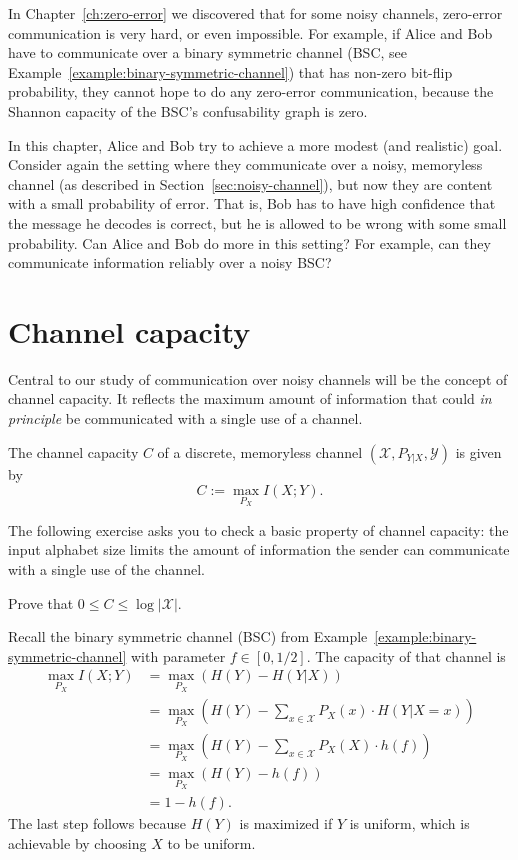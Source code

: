 

In Chapter~\ref{ch:zero-error} we discovered that for some noisy channels, zero-error communication is very hard, or even impossible. For example, if Alice and Bob have to communicate over a binary symmetric channel (BSC, see Example~\ref{example:binary-symmetric-channel}) that has non-zero bit-flip probability, they cannot hope to do any zero-error communication, because the Shannon capacity of the BSC's confusability graph is zero.

In this chapter, Alice and Bob try to achieve a more modest (and realistic) goal. Consider again the setting where they communicate over a noisy, memoryless channel (as described in Section~\ref{sec:noisy-channel}), but now they are content with a small probability of error. That is, Bob has to have high confidence that the message he decodes is correct, but he is allowed to be wrong with some small probability. Can Alice and Bob do more in this setting? For example, can they communicate information reliably over a noisy BSC?

\section{Channel capacity}
Central to our study of communication over noisy channels will be the concept of channel capacity. It reflects the maximum amount of information that could \emph{in principle} be communicated with a single use of a channel.

\begin{definition}
The channel capacity $C$ of a discrete, memoryless channel $(\mathcal{X}, P_{Y|X}, \mathcal{Y})$ is given by
\[
C:= \max_{P_X} I(X;Y).
\]
\end{definition}

The following exercise asks you to check a basic property of channel capacity: the input alphabet size limits the amount of information the sender can communicate with a single use of the channel.

\begin{exercise}
Prove that $0 \leq C \leq \log |\mathcal{X}|$.
\end{exercise}

\begin{example}
Recall the binary symmetric channel (BSC) from Example~\ref{example:binary-symmetric-channel} with parameter $f \in [0,1/2]$. The capacity of that channel is
\begin{align*}
\max_{P_X} I(X;Y) &= \max_{P_X} \left( H(Y) - H(Y|X)\right)\\
&= \max_{P_X} \left( H(Y) - \sum_{x \in \mathcal{X}} P_X(x) \cdot H(Y|X=x)\right)\\
&= \max_{P_X} \left( H(Y) - \sum_{x \in \mathcal{X}} P_X(X) \cdot h(f)\right)\\
&= \max_{P_X} \left( H(Y) - h(f)\right)\\
&= 1- h(f).
\end{align*}
The last step follows because $H(Y)$ is maximized if $Y$ is uniform, which is achievable by choosing $X$ to be uniform.
\end{example}

